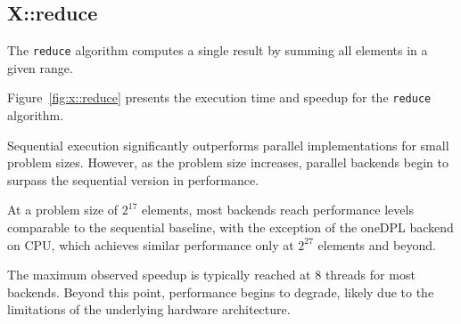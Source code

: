 \documentclass[sigconf]{acmart}
\begin{document}
\subsection{X::reduce}
The \texttt{reduce} algorithm computes a single result by summing all elements
in a given range.

Figure~\ref{fig:x::reduce} presents the execution time and speedup for the
\texttt{reduce} algorithm.

Sequential execution significantly outperforms parallel implementations for
small problem sizes. However, as the problem size increases, parallel backends
begin to surpass the sequential version in performance.

At a problem size of $2^{17}$ elements, most backends reach performance levels
comparable to the sequential baseline, with the exception of the oneDPL backend
on CPU, which achieves similar performance only at $2^{27}$ elements and
beyond.

The maximum observed speedup is typically reached at 8 threads for most
backends. Beyond this point, performance begins to degrade, likely due to the
limitations of the underlying hardware architecture.
\end{document}
